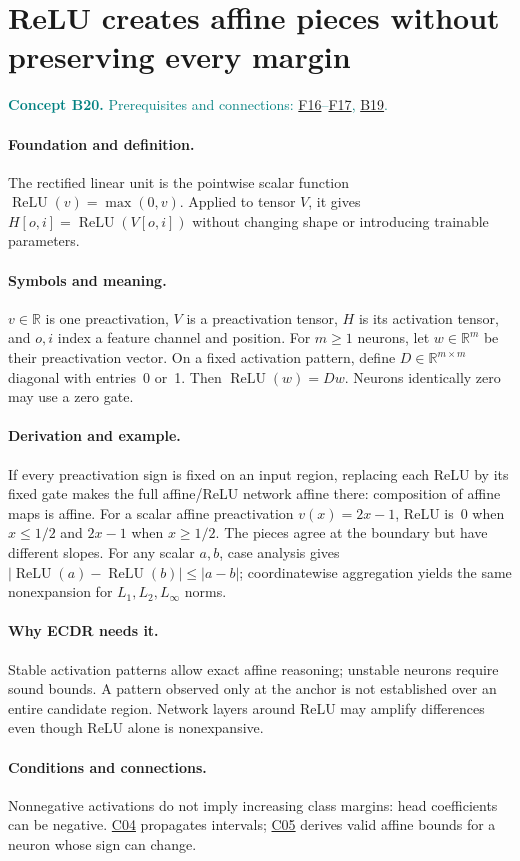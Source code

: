 \documentclass[11pt,a4paper]{article}
\newcommand{\R}{\mathbb R}
\newcommand{\relu}{\operatorname{ReLU}}
\newcommand{\conceptid}{Front matter}
\newcommand{\concept}[3]{\clearpage\renewcommand{\conceptid}{#1}%
\section{#2}\label{concept:#1}%
\textcolor{teal}{\textbf{Concept #1.} Prerequisites and connections: #3.}\par
\typeout{ECDR-CONCEPT-START #1 PAGE=\thepage}}
\begin{document}
\concept{B20}{ReLU creates affine pieces without preserving every margin}{\hyperref[concept:F16]{F16}--\hyperref[concept:F17]{F17}, \hyperref[concept:B19]{B19}}
\paragraph{Foundation and definition.}
The rectified linear unit is the pointwise scalar function
$\relu(v)=\max(0,v)$. Applied to tensor $V$, it gives $H[o,i]=\relu(V[o,i])$
without changing shape or introducing trainable parameters.
\paragraph{Symbols and meaning.}
$v\in\R$ is one preactivation, $V$ is a preactivation tensor, $H$ is
its activation tensor, and $o,i$ index a feature channel and position.
For $m\ge1$ neurons, let $w\in\R^m$ be their preactivation vector.
On a fixed activation pattern, define $D\in\R^{m\times m}$ diagonal
with entries~0 or~1. Then $\relu(w)=Dw$. Neurons identically zero may use a zero gate.
\paragraph{Derivation and example.}
If every preactivation sign is fixed on an input region, replacing each
ReLU by its fixed gate makes the full affine/ReLU network affine there:
composition of affine maps is affine. For a scalar affine preactivation
$v(x)=2x-1$, ReLU is~0 when $x\le1/2$ and $2x-1$ when $x\ge1/2$.
The pieces agree at the boundary but have different slopes.
For any scalar $a,b$, case analysis gives
$|\relu(a)-\relu(b)|\le|a-b|$; coordinatewise aggregation yields the
same nonexpansion for $L_1,L_2,L_\infty$ norms.
\paragraph{Why ECDR needs it.}
Stable activation patterns allow exact affine reasoning; unstable neurons
require sound bounds. A pattern observed only at the anchor is not
established over an entire candidate region. Network layers around ReLU
may amplify differences even though ReLU alone is nonexpansive.
\paragraph{Conditions and connections.}
Nonnegative activations do not imply increasing class margins: head
coefficients can be negative. \hyperref[concept:C04]{C04} propagates intervals; \hyperref[concept:C05]{C05} derives valid
affine bounds for a neuron whose sign can change.
\par\label{endconcept:B20}
\end{document}
